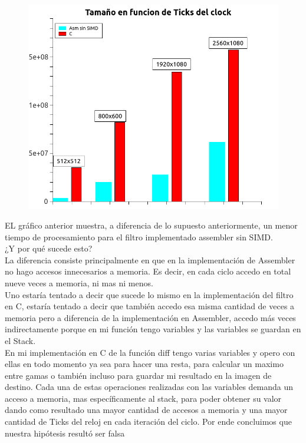  \begin{figure}[H]
\begin{center}
  \includegraphics[width=\linewidth]{diffsinsimd/ASMssd.C.png}
\end{center}
\end{figure}
EL gráfico anterior muestra, a diferencia de lo supuesto anteriormente, un menor tiempo de procesamiento para el filtro implementado assembler sin SIMD.\\
¿Y por qué sucede esto?\\
La diferencia consiste principalmente en que en la implementación de Assembler no hago accesos innecesarios a memoria. Es decir, en cada ciclo accedo en total nueve veces a memoria, ni mas ni menos.\\
 Uno estaría tentado a decir que sucede lo mismo en la implementación del filtro en C, estaría tentado a decir que también accedo esa misma cantidad de veces a memoria pero a diferencia de la implementación en Assembler, accedo más veces indirectamente porque en mi función tengo variables y las variables se guardan en el Stack.\\
 En mi implementación en C de la función diff tengo varias variables y opero con ellas en todo momento ya sea para hacer una resta, para calcular un maximo entre gamas o también incluso para guardar mi resultado en la imagen de destino. Cada una de estas operaciones realizadas con las variables demanda un acceso a memoria, mas específicamente al stack, para poder obtener su valor dando como resultado una mayor cantidad de accesos a memoria y una mayor cantidad de Ticks del reloj en cada iteración del ciclo. Por ende concluimos que nuestra hipótesis resultó ser falsa\\
 

  
 





